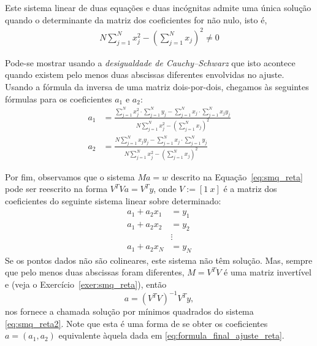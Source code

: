 Este sistema linear de duas equações e duas incógnitas admite uma única solução quando o determinante da matriz dos coeficientes for não nulo, isto é,  
\begin{eqnarray*}
N \sum_{j=1}^N x_j^2 - \left(\sum_{j=1}^N x_j\right)^2 \neq 0 
\end{eqnarray*}

Pode-se mostrar usando a \emph{desigualdade de Cauchy–Schwarz} que isto acontece quando existem pelo menos duas abscissas diferentes envolvidas no ajuste.  Usando a fórmula da inversa de uma matriz dois-por-dois, chegamos às seguintes fórmulas para os coeficientes $a_1$ e $a_2$:
  \begin{equation}\label{eq:formula_final_ajuste_reta}
    \begin{split}
    a_1 &= \frac{\sum_{j=1}^N x_j^2  \cdot \sum_{j=1}^N y_j - \sum_{j=1}^N x_j \cdot \sum_{j=1}^N x_jy_j}{N \sum_{j=1}^N x_j^2 - \left(\sum_{j=1}^N x_j\right)^2}\\
    a_2 &= \frac{N \sum_{j=1}^N x_jy_j - \sum_{j=1}^N x_j  \cdot \sum_{j=1}^N y_j }{N \sum_{j=1}^N x_j^2 - \left(\sum_{j=1}^N x_j\right)^2}      
    \end{split}
\end{equation}

Por fim, observamos que o sistema $Ma = w$ descrito na Equação~\eqref{eq:smq_reta} pode ser reescrito na forma $V^TVa = V^Ty$, onde $V := [1~x]$ é a matriz dos coeficientes do seguinte sistema linear sobre determinado:
\begin{equation}\label{eq:smq_reta2}
  \begin{split}
  a_1 + a_2x_1 &= y_1\\
  a_1 + a_2x_2 &= y_2\\
  &\vdots\\
  a_1 + a_2x_N &= y_N
  \end{split}
\end{equation}
Se os pontos dados não são colineares, este sistema não têm solução. Mas, sempre que pelo menos duas abscissas foram diferentes, $M = V^TV$ é uma matriz invertível e (veja o Exercício~\ref{exer:smq_reta}), então
\begin{equation}\label{eq:sol_smq_reta}
  a = \left(V^TV\right)^{-1}V^Ty,
\end{equation}
nos fornece a chamada solução por mínimos quadrados do sistema \eqref{eq:smq_reta2}. Note que esta é uma forma de se obter os coeficientes $a = (a_1, a_2)$ equivalente àquela dada em \eqref{eq:formula_final_ajuste_reta}.


